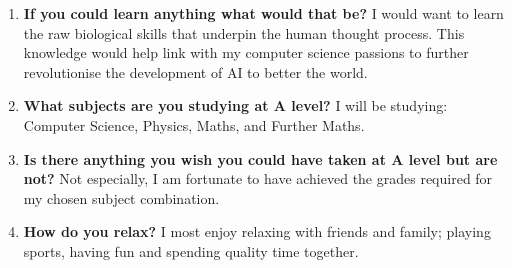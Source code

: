 \begin{enumerate}
    \item \textbf{If you could learn anything what would that be?} I would want to learn the raw biological skills that underpin the human thought process. This knowledge would help link with my computer science passions to further revolutionise the development of AI to better the world.

    \item \textbf{What subjects are you studying at A level?} I will be studying: Computer Science, Physics, Maths, and Further Maths.

    \item \textbf{Is there anything you wish you could have taken at A level but are not?} Not especially, I am fortunate to have achieved the grades required for my chosen subject combination.

    \item \textbf{How do you relax?} I most enjoy relaxing with friends and family; playing sports, having fun and spending quality time together.
\end{enumerate}